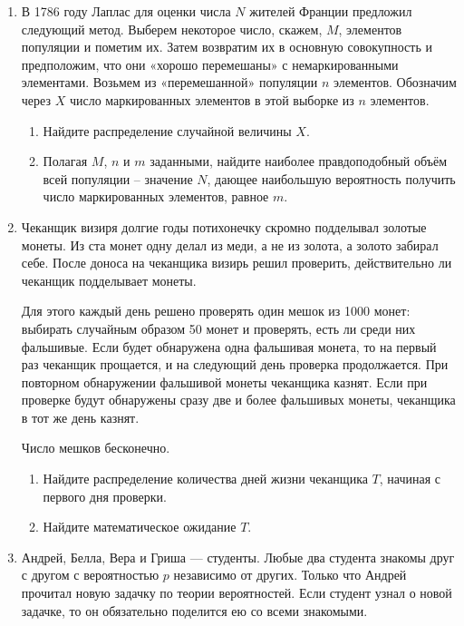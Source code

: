 \begin{enumerate}[resume]
    \item В 1786 году Лаплас для оценки числа $N$ жителей Франции предложил следующий метод. 
    Выберем некоторое число, скажем, $M$, элементов популяции и пометим их. 
    Затем возвратим их в основную совокупность и предположим, что они «хорошо перемешаны» 
    с немаркированными элементами. Возьмем из «перемешанной» популяции $n$ элементов. 
    Обозначим через $X$ число маркированных элементов в этой выборке из $n$ элементов.

    \begin{enumerate}
        \item Найдите распределение случайной величины $X$.
        \item Полагая $M$, $n$ и $m$ заданными, найдите наиболее правдоподобный объём всей популяции – значение $N$, 
        дающее наибольшую вероятность получить число маркированных элементов, равное $m$.
    \end{enumerate}

    \item Чеканщик визиря долгие годы потихонечку скромно подделывал золотые монеты. 
    Из ста монет одну делал из меди, а не из золота, а золото забирал себе. 
    После доноса на чеканщика визирь решил проверить, действительно ли чеканщик подделывает монеты.

    Для этого каждый день решено проверять один мешок из 1000 монет: 
    выбирать случайным образом 50 монет и проверять, есть ли среди них фальшивые. 
    Если будет обнаружена одна фальшивая монета, то на первый раз чеканщик прощается, 
    и на следующий день проверка продолжается. При повторном обнаружении фальшивой монеты чеканщика казнят. Если при проверке будут обнаружены сразу две и более фальшивых монеты, чеканщика в тот же день казнят.

    Число мешков бесконечно.

    \begin{enumerate}
        \item Найдите распределение количества дней жизни чеканщика $T$, начиная с первого дня проверки.
        \item  Найдите математическое ожидание $T$.
    \end{enumerate}

    \item Андрей, Белла, Вера и Гриша — студенты. 
    Любые два студента знакомы друг с другом с вероятностью $p$ независимо от других.
    Только что Андрей прочитал новую задачку по теории вероятностей. Если студент узнал о новой задачке, то он обязательно поделится ею со всеми знакомыми.


\end{enumerate}
